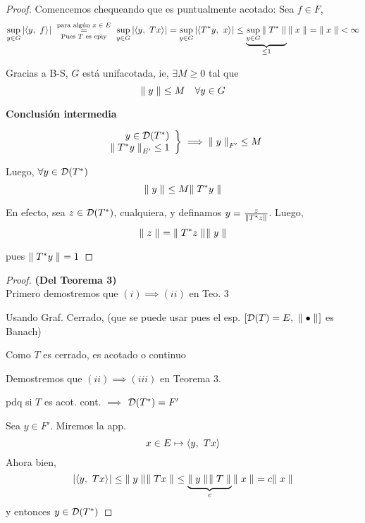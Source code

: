 \begin{proof}
Comencemos chequeando que es puntualmente acotado: Sea $f \in F$, $$
\sup_{y\in G} \abs{ \prodint[]{y}{f} }
\ \underset{\text{Pues $T$ es epiy}}{\overset{\text{para algún $x\in E$}}{=}}  \
\sup_{y\in G}\abs{ \prodint[]{y}{Tx} } 
= \sup_{y \in G} \abs{ \prodint[]{T\adj y}{x} }
\leq \underbrace{\sup_{y \in G} \norm[]{T\adj}}_{\leq 1}  \norm[]{x}
= \norm[]{x}
< \infty
$$

Gracias a B-S, $G$ está unif\mte acotada, ie, $\exists M \geq 0$ tal que $$
\norm[]{y} \leq M\quad \forall y \in G
$$

\textbf{Conclusión intermedia}

\begin{equation}\label{eqn:concl-int}
\left.
\begin{array}{r}
     y \in \cd(T\adj)\\
     \norm[E']{T\adj y} \leq 1
\end{array}\right \}
\implies \norm[F']{y} \leq M
\end{equation}

Luego, $\forall y \in \cd(T\adj)$ $$
\norm[]{y} \leq M \norm[]{T\adj y}
$$

En efecto, sea $z \in \cd(T\adj )$, cualquiera, y definamos $y = \frac{z}{\norm[]{T\adj z}}$. Luego, $$
\norm[]{z} = \norm[]{T\adj z} \norm[]{y}
$$

pues $\norm[]{T\adj y} = 1$

\end{proof}

\begin{proof} \textbf{(Del Teorema 3)}\\
Primero demostremos que $(i) \implies (ii)$ en Teo. 3

Usando Graf. Cerrado, (que se puede usar pues el esp. $[\cd(T)=E,\ \norm[]{\bullet}]$ es Banach)

Como $T$ es cerrado, es acotado o continuo

Demostremos que $(ii)\implies (iii)$ en Teorema 3.

pdq si $T$ es acot. cont. $\implies$ $\cd(T\adj) = F'$

Sea $y \in F'$. Miremos la app. $$
x\in E \mapsto \prodint[]{y}{Tx}
$$ Ahora bien, $$
\abs{ \prodint[]{y}{Tx} } 
\leq \norm[]{y} \norm[]{Tx}
\leq \underbrace{ \norm[]{y} \norm[]{T}}_{c} \norm[]{x} 
= c \norm[]{x}
$$ y entonces $y \in \cd(T\adj)$



\end{proof}


